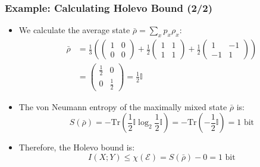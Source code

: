 \begin{frame}
    \frametitle{Example: Calculating Holevo Bound (2/2)}

    \begin{itemize}
        \item We calculate the average state $\bar{\rho} = \sum_x p_x \rho_x$:
              \begin{align*}
                  \bar{\rho} & = \frac{1}{3} \left( \begin{pmatrix} 1 & 0 \\ 0 & 0 \end{pmatrix} + \frac{1}{2}\begin{pmatrix} 1 & 1 \\ 1 & 1 \end{pmatrix} + \frac{1}{2}\begin{pmatrix} 1 & -1 \\ -1 & 1 \end{pmatrix} \right) \\
                             & = \begin{pmatrix} \frac{1}{2} & 0 \\ 0 & \frac{1}{2} \end{pmatrix} = \frac{1}{2} \mathbb{I}
              \end{align*}

        \item The von Neumann entropy of the maximally mixed state $\bar{\rho}$ is:
              \begin{equation*}
                  S(\bar{\rho}) = - \text{Tr}\left(\frac{1}{2}\mathbb{I} \log_2 \frac{1}{2}\mathbb{I}\right) = - \text{Tr}\left(-\frac{1}{2}\mathbb{I}\right) = 1 \text{ bit}
              \end{equation*}

        \item Therefore, the Holevo bound is:
              \begin{equation*}
                  I(X; Y) \leq \chi(\mathcal{E}) = S(\bar{\rho}) - 0 = 1 \text{ bit}
              \end{equation*}
    \end{itemize}

\end{frame}